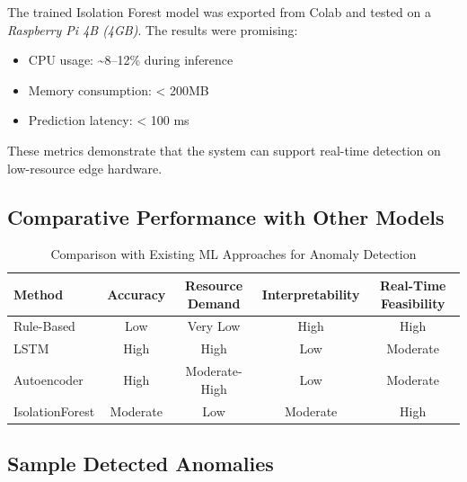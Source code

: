 \documentclass[12pt, draftclsnofoot, onecolumn]{IEEEtran}
\begin{document}
The trained Isolation Forest model was exported from Colab and tested on a \textit{Raspberry Pi 4B (4GB)}. The results were promising:

\begin{itemize}
	\item CPU usage: \textasciitilde8–12\% during inference
	\item Memory consumption: < 200MB
	\item Prediction latency: < 100 ms
\end{itemize}

These metrics demonstrate that the system can support real-time detection on low-resource edge hardware.

\subsection{Comparative Performance with Other Models}

\begin{table}[h!]
	\centering
	\caption{Comparison with Existing ML Approaches for Anomaly Detection}
	
		\begin{tabular}{|l|c|c|c|c|}
			\hline
			\textbf{Method} & \textbf{Accuracy} & \textbf{Resource Demand} & \textbf{Interpretability} & \textbf{Real-Time Feasibility} \\
			\hline
			Rule-Based     & Low      & Very Low      & High      & High \\
			LSTM           & High     & High          & Low       & Moderate \\
			Autoencoder    & High     & Moderate-High & Low       & Moderate \\
			IsolationForest& Moderate & Low           & Moderate  & High \\
			\hline
		\end{tabular}
	
	\label{table:model-comparison}
\end{table}

\subsection{Sample Detected Anomalies}
\end{document}
